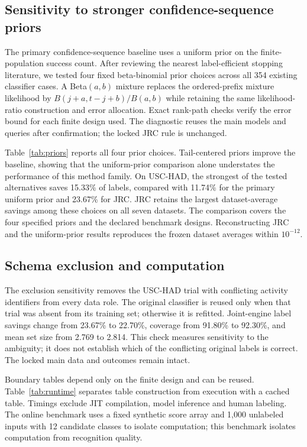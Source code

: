 \documentclass[pdflatex,sn-basic,Numbered,iicol]{sn-jnl}
\begin{document}
\subsection{Sensitivity to stronger confidence-sequence priors}
The primary confidence-sequence baseline uses a uniform prior on the finite-population success count. After reviewing the nearest label-efficient stopping literature, we tested four fixed beta-binomial prior choices across all 354 existing classifier cases. A Beta$(a,b)$ mixture replaces the ordered-prefix mixture likelihood by $B(j+a,t-j+b)/B(a,b)$ while retaining the same likelihood-ratio construction and error allocation. Exact rank-path checks verify the error bound for each finite design used. The diagnostic reuses the main models and queries after confirmation; the locked JRC rule is unchanged.

Table~\ref{tab:priors} reports all four prior choices. Tail-centered priors improve the baseline, showing that the uniform-prior comparison alone understates the performance of this method family. On USC-HAD, the strongest of the tested alternatives saves 15.33\% of labels, compared with 11.74\% for the primary uniform prior and 23.67\% for JRC. JRC retains the largest dataset-average savings among these choices on all seven datasets. The comparison covers the four specified priors and the declared benchmark designs. Reconstructing JRC and the uniform-prior results reproduces the frozen dataset averages within $10^{-12}$.



\subsection{Schema exclusion and computation}
The exclusion sensitivity removes the USC-HAD trial with conflicting activity identifiers from every data role. The original classifier is reused only when that trial was absent from its training set; otherwise it is refitted. Joint-engine label savings change from 23.67\% to 22.70\%, coverage from 91.80\% to 92.30\%, and mean set size from 2.769 to 2.814. This check measures sensitivity to the ambiguity; it does not establish which of the conflicting original labels is correct. The locked main data and outcomes remain intact.

Boundary tables depend only on the finite design and can be reused. Table~\ref{tab:runtime} separates table construction from execution with a cached table. Timings exclude JIT compilation, model inference and human labeling. The online benchmark uses a fixed synthetic score array and 1,000 unlabeled inputs with 12 candidate classes to isolate computation; this benchmark isolates computation from recognition quality.
\end{document}
